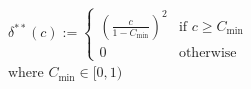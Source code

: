 \begin{equation}
\begin{split}
	&\delta^{**}(c) := 
	\begin{cases} 
		\left(\frac{c}{1-C_\text{min}}\right)^2 & \text{if } c \geq C_\text{min} \\
		0 & \text{otherwise}
	\end{cases}\\
	&\text{where } C_\text{min} \in [0, 1)
\end{split}
\label{ch4:equ:metric-utilisation-scaling}
\end{equation}
